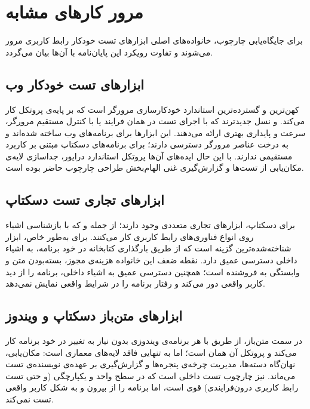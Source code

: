 \chapter{مرور کارهای مشابه}
\label{chap:related}

برای جایگاه‌یابی چارچوب، خانواده‌های اصلی ابزارهای تست خودکار رابط کاربری مرور می‌شوند و تفاوت رویکرد این پایان‌نامه با آن‌ها بیان می‌گردد.

\section{ابزارهای تست خودکار وب}
\cite{selenium}
کهن‌ترین و گسترده‌ترین استاندارد خودکارسازی مرورگر است که بر پایه‌ی پروتکل
کار می‌کند.
\cite{cypress}
و
\cite{playwright}
نسل جدیدترند که با اجرای تست در همان فرایند یا با کنترل مستقیم مرورگر، سرعت و پایداری بهتری ارائه می‌دهند. این ابزارها برای برنامه‌های وب ساخته شده‌اند و به درخت عناصر مرورگر دسترسی دارند؛ برای برنامه‌های دسکتاپ مبتنی بر
کاربرد مستقیمی ندارند. با این حال ایده‌های آن‌ها \pdash{} پروتکل استاندارد درایور، جداسازی لایه‌ی مکان‌یابی از تست‌ها و گزارش‌گیری غنی \pdash{} الهام‌بخش طراحی چارچوب حاضر بوده است.

\section{ابزارهای تجاری تست دسکتاپ}
برای دسکتاپ، ابزارهای تجاری متعددی وجود دارند؛ از جمله
و
که با بازشناسی اشیاء روی انواع فناوری‌های رابط کاربری کار می‌کنند. برای
به‌طور خاص، ابزار
\cite{squish}
شناخته‌شده‌ترین گزینه است که از طریق بارگذاری کتابخانه در خود برنامه، به اشیاء داخلی
دسترسی عمیق دارد. نقطه ضعف این خانواده هزینه‌ی مجوز، بسته‌بودن متن و وابستگی به فروشنده است؛ همچنین دسترسی عمیق به اشیاء داخلی، برنامه را از دید کاربر واقعی دور می‌کند و رفتار برنامه را در شرایط واقعی نمایش نمی‌دهد.

\section{ابزارهای متن‌باز دسکتاپ و ویندوز}
در سمت متن‌باز،
\cite{winappdriver}
از طریق
\cite{uia}
با هر برنامه‌ی ویندوزی \pdash{} بدون نیاز به تغییر در خود برنامه \pdash{} کار می‌کند و پروتکل آن همان
است؛ اما به تنهایی فاقد لایه‌های معماری است: مکان‌یابی، نهان‌گاه دسته‌ها، مدیریت چرخه‌ی پنجره‌ها و گزارش‌گیری بر عهده‌ی نویسنده‌ی تست می‌ماند.
\cite{qtcitest}
نیز چارچوب تست داخلی
است که در سطح واحد و یکپارچگی (و حتی تست رابط کاربری درون‌فرایندی) قوی است، اما برنامه را از بیرون و به شکل کاربر واقعی تست نمی‌کند.

